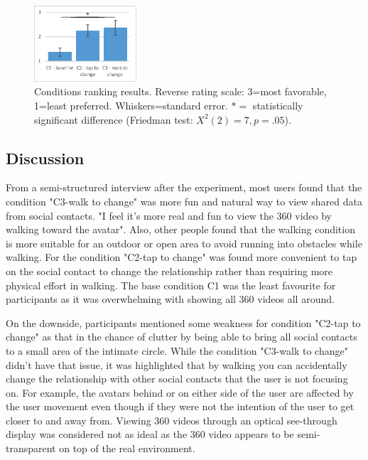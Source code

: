 \begin{figure}
  \centering
  \includegraphics[width=1.5in]{images/chi/images-05.eps}
  \caption{Conditions ranking results. Reverse rating scale: 3=most favorable, 1=least preferred. Whiskers=standard error. $*=$ statistically significant difference (Friedman test: $X^2(2)=7, p=.05$).}  
  	\label{fig:data:ranking}
\end{figure}

\subsection{Discussion}

From a semi-structured interview after the experiment, most users found that the condition "C3-walk to change" was more fun and natural way to view shared data from social contacts. "I feel it's more real and fun to view the 360 video by walking toward the avatar". Also, other people found that the walking condition is more suitable for an outdoor or open area to avoid running into obstacles while walking. For the condition "C2-tap to change" was found more convenient to tap on the social contact to change the relationship rather than requiring more physical effort in walking. The base condition C1 was the least favourite for participants as it was overwhelming with showing all 360 videos all around. 

On the downside, participants mentioned some weakness for condition "C2-tap to change" as that in the chance of clutter by being able to bring all social contacts to a small area of the intimate circle. While the condition "C3-walk to change" didn't have that issue, it was highlighted that by walking you can accidentally change the relationship with other social contacts that the user is not focusing on. For example, the avatars behind or on either side of the user are affected by the user movement even though if they were not the intention of the user to get closer to and away from.
Viewing 360 videos through an optical see-through display was considered not as ideal as the 360 video appears to be semi-transparent on top of the real environment.

